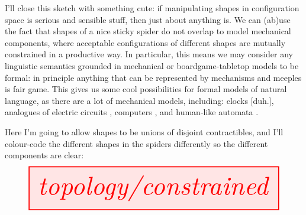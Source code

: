 I'll close this sketch with something cute: if manipulating shapes in configuration space is serious and sensible stuff, then just about anything is. We can (ab)use the fact that shapes of a nice sticky spider do not overlap to model mechanical components, where acceptable configurations of different shapes are mutually constrained in a productive way. In particular, this means we may consider any linguistic semantics grounded in mechanical or boardgame-tabletop models to be formal: in principle anything that can be represented by mechanisms and meeples is fair game. This gives us some cool possibilities for formal models of natural language, as there are a lot of mechanical models, including: clocks [duh.], analogues of electric circuits \citep{noauthor_spintronics_nodate}, computers \citep{richard_ridel_mechanical_2015}, and human-like automata \citep{wikipedia_authors_jaquet-droz_2022}.

\begin{example}
Here I'm going to allow shapes to be unions of disjoint contractibles, and I'll colour-code the different shapes in the spiders differently so the different components are clear:
\[\resizebox{\textwidth}{!}{\tikzfig{topology/constrained}}\]
\end{example}